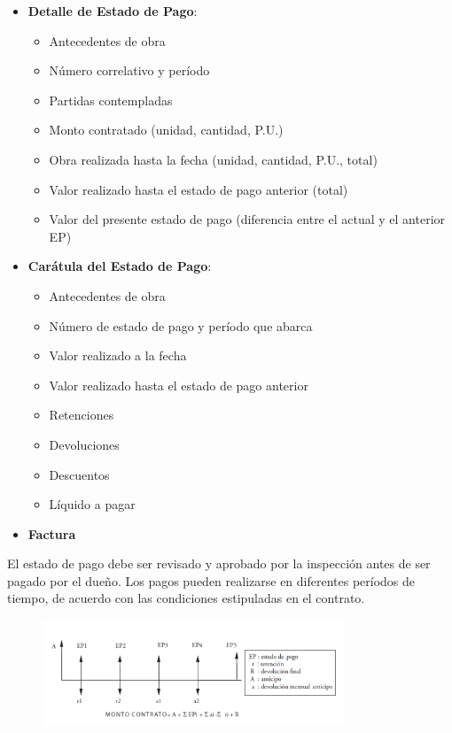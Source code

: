 \begin{itemize}
    \item \textbf{Detalle de Estado de Pago}:
    \begin{itemize}
        \item Antecedentes de obra
        \item Número correlativo y período
        \item Partidas contempladas
        \item Monto contratado (unidad, cantidad, P.U.)
        \item Obra realizada hasta la fecha (unidad, cantidad, P.U., total)
        \item Valor realizado hasta el estado de pago anterior (total)
        \item Valor del presente estado de pago (diferencia entre el actual y el anterior EP)
    \end{itemize}
    
    \item \textbf{Carátula del Estado de Pago}:
    \begin{itemize}
        \item Antecedentes de obra
        \item Número de estado de pago y período que abarca
        \item Valor realizado a la fecha
        \item Valor realizado hasta el estado de pago anterior
        \item Retenciones
        \item Devoluciones
        \item Descuentos
        \item Líquido a pagar
    \end{itemize}
    
    \item \textbf{Factura}
\end{itemize}

El estado de pago debe ser revisado y aprobado por la inspección antes de ser pagado por el dueño. Los pagos pueden realizarse en diferentes períodos de tiempo, de acuerdo con las condiciones estipuladas en el contrato.

\begin{figure}[H]
    \centering
    \includegraphics[width=0.8\textwidth]{FOTOS/sist_pag.png}
    \label{fig:estado_pago}
\end{figure}




